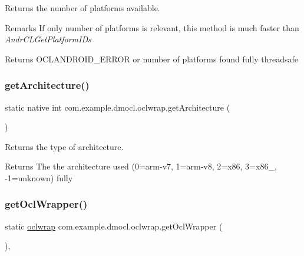 Returns the number of platforms available. \begin{DoxyRemark}{Remarks}
If only number of platforms is relevant, this method is much faster than {\itshape Andr\+C\+L\+Get\+Platform\+I\+Ds} 
\end{DoxyRemark}
\begin{DoxyReturn}{Returns}
O\+C\+L\+A\+N\+D\+R\+O\+I\+D\+\_\+\+E\+R\+R\+OR or number of platforms found  fully threadsafe 
\end{DoxyReturn}
\mbox{\label{classcom_1_1example_1_1dmocl_1_1oclwrap_afd9731ebb0d18315fe3762fc329fcec4}} 
\subsubsection{\texorpdfstring{get\+Architecture()}{getArchitecture()}}
{\footnotesize\ttfamily static native int com.\+example.\+dmocl.\+oclwrap.\+get\+Architecture (\begin{DoxyParamCaption}{ }\end{DoxyParamCaption})\hspace{0.3cm}{\ttfamily [static]}}

Returns the type of architecture. \begin{DoxyReturn}{Returns}
The the architecture used (0=arm-\/v7, 1=arm-\/v8, 2=x86, 3=x86\+\_, -\/1=unknown)  fully 
\end{DoxyReturn}
\mbox{\label{classcom_1_1example_1_1dmocl_1_1oclwrap_a8c8c9a75d3d834cb71725d92ddeb4af7}} 
\subsubsection{\texorpdfstring{get\+Ocl\+Wrapper()}{getOclWrapper()}}
{\footnotesize\ttfamily static \mbox{\hyperlink{classcom_1_1example_1_1dmocl_1_1oclwrap}{oclwrap}} com.\+example.\+dmocl.\+oclwrap.\+get\+Ocl\+Wrapper (\begin{DoxyParamCaption}{ }\end{DoxyParamCaption})\hspace{0.3cm}{\ttfamily [inline]}, {\ttfamily [static]}}

